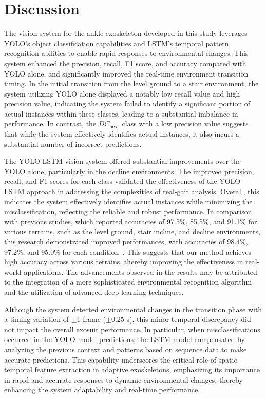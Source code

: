 \documentclass[actuators,article,accept,pdftex,moreauthors]{Definitions/mdpi}
\begin{document}
\section{Discussion}

The vision system for the ankle exoskeleton developed in this study leverages YOLO's object classification capabilities and LSTM's temporal pattern recognition abilities to enable rapid responses to environmental changes. This system enhanced the precision, recall, F1 score, and accuracy compared with YOLO alone, and significantly improved the real-time environment transition timing.
{In the initial transition from the level ground to a stair environment, the system utilizing YOLO alone displayed a notably low recall value and high precision value, indicating the system failed to identify a significant portion of actual instances within these classes, leading to a substantial imbalance in performance. In contrast, the $DC_{\text{next}}$ class with a low precision value suggests that while the system effectively identifies actual instances, it also incurs a substantial number of incorrect predictions.}

{The YOLO-LSTM vision system offered substantial improvements over the YOLO alone, particularly in the decline environments. The improved precision, recall, and F1 scores for each class validated the effectiveness of the YOLO-LSTM approach in addressing the complexities of real-gait analysis. Overall, this indicates the system effectively identifies actual instances while minimizing the misclassification, reflecting the reliable and robust performance.}
{In comparison with previous studies, which reported accuracies of 97.5\%, 85.5\%, and 91.1\% for various terrains, such as the level ground, stair incline, and decline environments, this research demonstrated improved performances, with accuracies of 98.4\%, 97.2\%, and 95.0\% for each condition~\cite{Tricomi2023}. This suggests that our method achieves high accuracy across various terrains, thereby improving the effectiveness in real-world applications. The advancements observed in the results may be attributed to the integration of a more sophisticated environmental recognition algorithm and the utilization of advanced deep learning techniques.}

Although the system detected environmental changes in the transition phase with a timing variation of $\pm$1 frame ($\pm$0.25 s), this minor temporal discrepancy did not impact the overall exosuit performance. 
In particular, when misclassifications occurred in the YOLO model predictions, the LSTM model compensated by analyzing the previous context and patterns based on sequence data to make accurate predictions. This capability underscores the critical role of spatio-temporal feature extraction in adaptive exoskeletons, emphasizing its importance in rapid and accurate responses to dynamic environmental changes, thereby enhancing the system adaptability and real-time performance.
\end{document}
